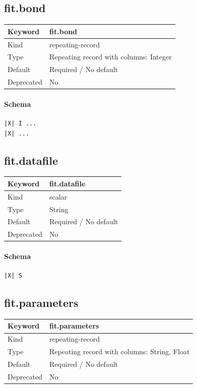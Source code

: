 \documentclass[11pt]{article}
\begin{document}
{{{{{\subsection{fit.bond}
\label{kw:fit-bond}
\begin{longtable}{|p{1.5in}|p{4.5in}|}
\hline
Keyword & fit.bond \\
\hline
Kind & repeating-record \\
\hline
Type & Repeating record with columns: Integer \\
\hline
Default & Required / No default \\
\hline
Deprecated & No \\
\hline
\end{longtable}
\paragraph{Schema}
\begin{Verbatim}
|X| I ...
|X| ...
\end{Verbatim}

\subsection{fit.datafile}
\label{kw:fit-datafile}
\begin{longtable}{|p{1.5in}|p{4.5in}|}
\hline
Keyword & fit.datafile \\
\hline
Kind & scalar \\
\hline
Type & String \\
\hline
Default & Required / No default \\
\hline
Deprecated & No \\
\hline
\end{longtable}
\paragraph{Schema}
\begin{Verbatim}
|X| S
\end{Verbatim}

\subsection{fit.parameters}
\label{kw:fit-parameters}
\begin{longtable}{|p{1.5in}|p{4.5in}|}
\hline
Keyword & fit.parameters \\
\hline
Kind & repeating-record \\
\hline
Type & Repeating record with columns: String, Float \\
\hline
Default & Required / No default \\
\hline
Deprecated & No \\
\hline
\end{longtable}
}}}}}
\end{document}
